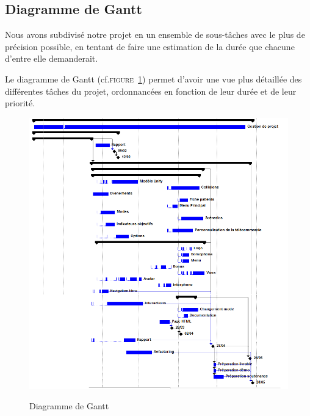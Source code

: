 \subsection{Diagramme de Gantt}
Nous avons subdivisé notre projet en un ensemble de sous-tâches avec le plus de précision possible, en tentant de faire une estimation de la durée que chacune d'entre elle demanderait.

Le diagramme de Gantt (cf.\textsc{figure~\ref{fig:gantt}}) permet d'avoir une vue plus détaillée des différentes tâches du projet, ordonnancées en fonction de leur durée et de leur priorité. 
\begin{figure}
	\centering
	\caption{Diagramme de Gantt}
			\includegraphics[width=\textwidth]{3-Planification/img/gantt.png}
	\label{fig:gantt}
\end{figure}
